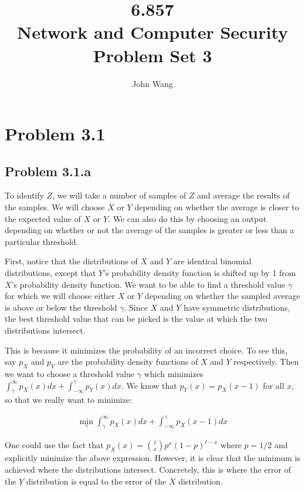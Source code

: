 \documentclass[psamsfonts]{amsart}
\title{6.857 \\
Network and Computer Security \\
Problem Set 3}
\author{John Wang}
\begin{document}
\maketitle

\section*{Problem 3.1}

\subsection*{Problem 3.1.a}

To identify $Z$, we will take a number of samples of $Z$ and average the results of the samples. We will choose $X$ or $Y$ depending on whether the average is closer to the expected value of $X$ or $Y$. We can also do this by choosing an output depending on whether or not the average of the samples is greater or less than a particular threshold.

First, notice that the distributions of $X$ and $Y$ are identical binomial distributions, except that $Y$'s probability density function is shifted up by 1 from $X$'s probability density function. We want to be able to find a threshold value $\gamma$ for which we will choose either $X$ or $Y$ depending on whether the sampled average is above or below the threshold $\gamma$. Since $X$ and $Y$ have symmetric distributions, the best threshold value that can be picked is the value at which the two distributions intersect.

This is because it minimizes the probability of an incorrect choice. To see this, say $p_{X}$ and $p_{Y}$ are the probability density functions of $X$ and $Y$ respectively. Then we want to choose a threshold value $\gamma$ which minimizes $\int_{\gamma}^{\infty} p_{X}(x) dx + \int_{-\infty}^\gamma p_Y(x) dx$. We know that $p_{Y}(x) = p_{X}(x-1)$ for all $x$, so that we really want to minimize:

\begin{eqnarray}
  \min_{\gamma} \int_{\gamma}^{\infty} p_{X}(x) dx + \int_{-\infty}^{\gamma} p_{X}(x-1) dx
\end{eqnarray}

One could use the fact that $p_X(x) = {t \choose x} p^x (1-p)^{t-x}$ where $p = 1/2$ and explicitly minimize the above expression. However, it is clear that the minimum is achieved where the distributions intersect. Concretely, this is where the error of the $Y$ distribution is equal to the error of the $X$ distribution.
\end{document}
